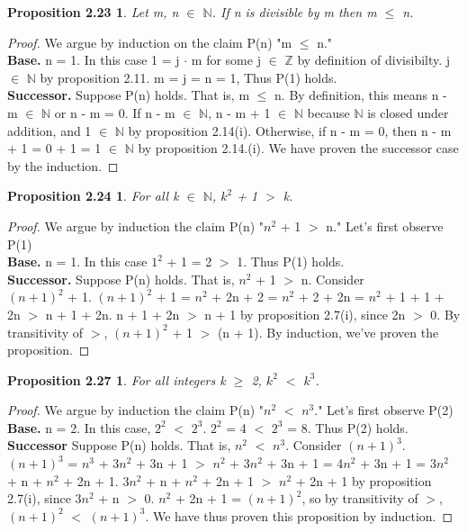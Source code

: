 \documentclass[12pt]{amsart}
\newcommand{\N}{\mathbb{N}}
\newcommand{\Z}{\mathbb{Z}}
\begin{document}
\newtheorem*{prop2.23}{Proposition 2.23}
\begin{prop2.23}
	Let m, n $\in$  $\N$. If n is divisible by m then m $\leq$ n.
\end{prop2.23}

\begin{proof}
	We argue by induction on the claim P(n) "m $\leq$ n."
	\\\textbf{Base.} n = 1. In this case 1 = j $\cdot$ m for some j $\in$ $\Z$ by definition of divisibilty. j $\in$ $\N$ by proposition 2.11. m = j = n = 1, Thus P(1) holds.
	\\\textbf{Successor.} Suppose P(n) holds. That is, m $\leq$ n. By definition, this means n - m $\in$ $\N$ or n - m  = 0. If n - m $\in$ $\N$, n - m + 1 $\in$ $\N$ because $\N$ is closed under addition, and 1 $\in$ $\N$ by proposition 2.14(i). Otherwise, if n - m = 0, then n - m + 1 = 0 + 1 = 1 $\in$ $\N$ by proposition 2.14.(i). We have proven the successor case by the induction.
\end{proof}

\newtheorem*{prop2.24}{Proposition 2.24}
\begin{prop2.24}
	For all k $\in$ $\N$, $k^2$ + 1 $>$ k.
\end{prop2.24}

\begin{proof}
	We argue by induction the claim P(n) "$n^2$ + 1 $>$ n." Let's first observe P(1)
	\\\textbf{Base.} n = 1. In this case $1^2$ + 1 = 2 $>$ 1. Thus P(1) holds.
	\\\textbf{Successor.} Suppose P(n) holds. That is, $n^2$ + 1 $>$ n. Consider \\$(n + 1)^2$ + 1. $(n + 1)^2$ + 1 = $n^2$ + 2n + 2 = $n^2$ + 2 + 2n = $n^2$ + 1 + 1 + 2n $>$ n + 1 + 2n. n + 1 + 2n $>$ n + 1 by proposition 2.7(i), since 2n $>$ 0. By transitivity of $>$, $(n + 1)^2$  + 1 $>$ (n + 1). By induction, we've proven the proposition.
\end{proof}

\newtheorem*{prop2.27}{Proposition 2.27}
\begin{prop2.27}
	For all integers k $\geq$ 2, $k^2$ $<$ $k^3$.
\end{prop2.27}

\begin{proof}
	We argue by induction the claim P(n) "$n^2$ $<$ $n^3$." Let's first observe P(2)
	\\\textbf{Base.} n = 2. In this case, $2^2$ $<$ $2^3$. $2^2$ = 4 $<$ $2^3$ = 8. Thus P(2) holds.
	\\\textbf{Successor} Suppose P(n) holds. That is, $n^2$ $<$ $n^3$. Consider $(n + 1)^3$. $(n + 1)^3$ = $n^3$ + 3$n^2$ + 3n + 1 $>$ $n^2$ + 3$n^2$ + 3n + 1 = 4$n^2$ + 3n + 1 = 3$n^2$ + n + $n^2$ + 2n + 1. 3$n^2$ + n + $n^2$ + 2n + 1 $>$ $n^2$ + 2n + 1 by proposition 2.7(i), since 3$n^2$ + n $>$ 0. $n^2$ + 2n + 1 = $(n + 1)^2$, so by transitivity of $>$, $(n + 1)^2$ $<$ $(n + 1)^3$. We have thus proven this proposition by induction.
\end{proof}
\end{document}

